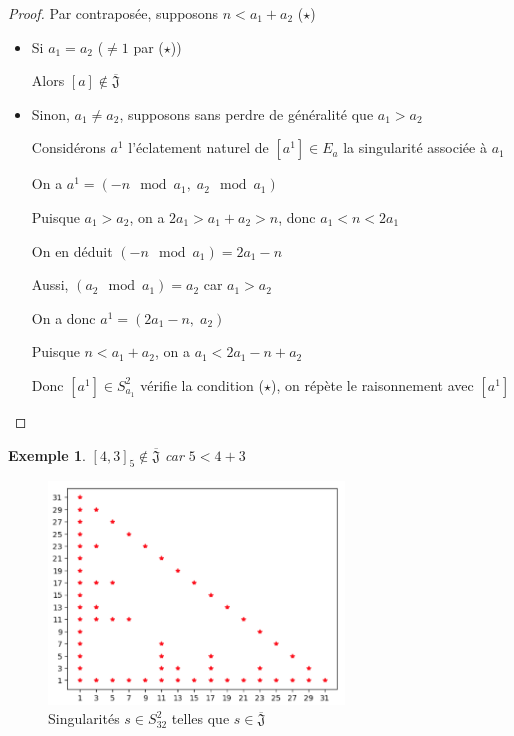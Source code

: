 \documentclass{article}
\newtheorem{example}{Exemple}
\begin{document}
\begin{proof}
    Par contraposée, supposons $n < a_1 + a_2$ ($\star$)

    \begin{itemize}
        \item Si $a_1 = a_2$ ($\neq 1$ par ($\star$))

            Alors $[a] \not \in \overline{\mathfrak{J}}$
        \item Sinon, $a_1 \neq a_2$, supposons sans perdre de généralité que $a_1 > a_2$

            Considérons $a^1$ l'éclatement naturel de $[a^1] \in E_a$ la singularité associée à $a_1$

            On a $a^1 = (-n \mod a_1,\; a_2 \mod a_1)$

            Puisque $a_1 > a_2$, on a $2a_1 > a_1 + a_2 > n$, donc $a_1 < n < 2a_1$

            On en déduit $(-n \mod a_1) = 2a_1 - n$

            Aussi, $(a_2 \mod a_1) = a_2$ car $a_1 > a_2$

            On a donc $a^1 = (2a_1-n,\; a_2)$

            Puisque $n < a_1 + a_2$, on a $a_1 < 2a_1 - n + a_2$

            Donc $[a^1] \in S_{a_1}^2$ vérifie la condition ($\star$), on répète le raisonnement avec $[a^1]$
    \end{itemize}
\end{proof}

\begin{example}
    ${[4, 3]}_5 \not \in \overline{\mathfrak{J}}$ car $5 < 4 + 3$
\end{example}

\begin{figure}[h]
    \caption{Singularités $s \in S_{32}^2$ telles que $s \in \overline{\mathfrak{J}}$}
    \centering
    \includegraphics[width=0.7\textwidth]{singularite_j_strict_m2_n32}
\end{figure}
\end{document}
